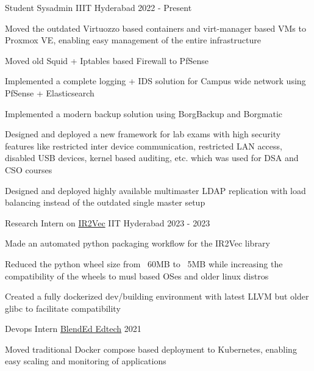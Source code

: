 
\begin{cventries}
	\cventry
	  {Student Sysadmin} %
	  {IIIT Hyderabad} %
	  {} %
	  {2022 - Present} %
	  {
		\begin{cvitems} %
		  \item {Moved the outdated Virtuozzo based containers and virt-manager based VMs to Proxmox VE, enabling easy management of the entire infrastructure}
		  \item {Moved old Squid + Iptables based Firewall to PfSense}
		  \item {Implemented a complete logging + IDS solution for Campus wide network using PfSense + Elasticsearch}
		  \item {Implemented a modern backup solution using BorgBackup and Borgmatic}
		  \item {Designed and deployed a new framework for lab exams with high security features like restricted inter device communication, restricted LAN access, disabled USB devices, kernel based auditing, etc. which was used for DSA and CSO courses}
		  \item {Designed and deployed highly available multimaster LDAP replication with load balancing instead of the outdated single master setup}
		\end{cvitems}
	  }
	\cventry
    {Research Intern on \href{https://github.com/IITH-Compilers/IR2Vec}{IR2Vec}} %
    {IIT Hyderabad} %
    {} %
    {2023 - 2023} %
    {
      \begin{cvitems} %
        \item {Made an automated python packaging workflow for the IR2Vec library}
        \item {Reduced the python wheel size from ~60MB to ~5MB while increasing the compatibility of the wheels to musl based OSes and older linux distros}
        \item {Created a fully dockerized dev/building environment with latest LLVM but older glibc to facilitate compatibility}
      \end{cvitems}
    }


  \cventry
    {Devops Intern} %
    {\href{https://blend-ed.org/}{BlendEd Edtech}} %
    {} %
    {2021} %
    {
      \begin{cvitems} %
        \item {Moved traditional Docker compose based deployment to Kubernetes, enabling easy scaling and monitoring of applications}
      \end{cvitems}
    }


\end{cventries}
